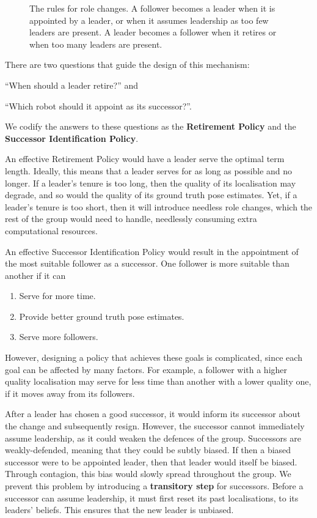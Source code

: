 \begin{figure}[!h]
	\centering
	

    \caption[Role Change State Machine]{The rules for role changes. A follower becomes a leader when it is appointed by a leader, or when it assumes leadership as too few leaders are present. A leader becomes a follower when it retires or when too many leaders are present.}
\end{figure}

There are two questions that guide the design of this mechanism:
\begin{enumerate*}
    \item ``When should a leader retire?'' and
    \item ``Which robot should it appoint as its successor?''.
\end{enumerate*}
We codify the answers to these questions as the \textbf{Retirement Policy} and the \textbf{Successor Identification Policy}.

An effective Retirement Policy would have a leader serve the optimal term length. Ideally, this means that a leader serves for as long as possible and no longer. If a leader's tenure is too long, then the quality of its localisation may degrade, and so would the quality of its ground truth pose estimates. Yet, if a leader's tenure is too short, then it will introduce needless role changes, which the rest of the group would need to handle, needlessly consuming extra computational resources.

An effective Successor Identification Policy would result in the appointment of the most suitable follower as a successor. One follower is more suitable than another if it can \begin{enumerate}
    \item Serve for more time.
    \item Provide better ground truth pose estimates.
    \item Serve more followers.
\end{enumerate}
However, designing a policy that achieves these goals is complicated, since each goal can be affected by many factors. For example, a follower with a higher quality localisation may serve for less time than another with a lower quality one, if it moves away from its followers.

After a leader has chosen a good successor, it would inform its successor about the change and subsequently resign. However, the successor cannot immediately assume leadership, as it could weaken the defences of the group. Successors are weakly-defended, meaning that they could be subtly biased. If then a biased successor were to be appointed leader, then that leader would itself be biased. Through contagion, this bias would slowly spread throughout the group. We prevent this problem by introducing a \textbf{transitory step} for successors. Before a successor can assume leadership, it must first reset its past localisations, to its leaders' beliefs. This ensures that the new leader is unbiased. 

